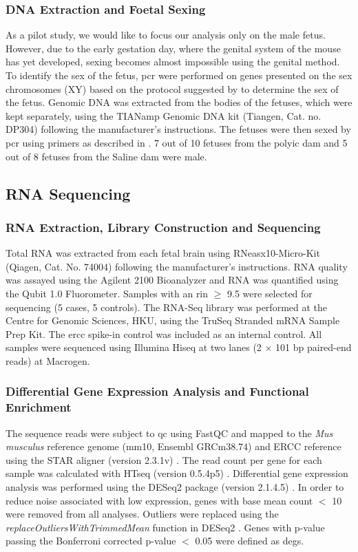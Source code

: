 \subsubsection{DNA Extraction and Foetal Sexing}
As a pilot study, we would like to focus our analysis only on the male fetus.
However, due to the early gestation day, where the genital system of the mouse has yet developed, sexing becomes almost impossible using the genital method.
To identify the sex of the fetus, \gls{pcr} were performed on genes presented on the sex chromosomes (XY) based on the protocol suggested by \citet{Clapcote2005a} to determine the sex of the fetus. 
Genomic DNA was extracted from the bodies of the fetuses, which were kept separately, using the TIANamp Genomic DNA kit (Tiangen, Cat. no. DP304) following the manufacturer's instructions.
The fetuses were then sexed by \gls{pcr} using primers as described in \citet{Clapcote2005a}.
 7 out of 10 fetuses from the \gls{polyic} dam and 5 out of 8 fetuses from the Saline dam were male.


\subsection{RNA Sequencing}
\subsubsection{RNA Extraction, Library Construction and Sequencing}
Total RNA was extracted from each fetal brain using RNeasx10-Micro-Kit (Qiagen, Cat. No. 74004) following the manufacturer’s instructions. 
RNA quality was assayed using the Agilent 2100 Bioanalyzer and RNA was quantified using the Qubit 1.0 Fluorometer. 
Samples with an \gls{rin} $\ge$ 9.5 were selected for sequencing (5 cases, 5 controls). 
The RNA-Seq library was performed at the Centre for Genomic Sciences, HKU, using the TruSeq Stranded mRNA Sample Prep Kit. 
The \gls{ercc} spike-in control \citep{Jiang2011a} was included as an internal control. 
All samples were sequenced using Illumina Hiseq at two lanes (2 $\times$ 101 bp paired-end reads) at Macrogen.

\subsubsection{Differential Gene Expression Analysis and Functional Enrichment}

The sequence reads were subject to \gls{qc} using FastQC \citep{Andrews} and mapped to the \textit{Mus musculus} reference genome (mm10, Ensembl GRCm38.74) and ERCC reference using the STAR aligner (version 2.3.1v) \citep{Dobin2013}.
The read count per gene for each sample was calculated with HTseq (version 0.5.4p5) \citep{Anders2015}.
Differential gene expression analysis was performed using the DESeq2 package (version 2.1.4.5) \citep{Anders2010}.
In order to reduce noise associated with low expression, genes with base mean count $<$ 10 were removed from all analyses.
Outliers were replaced using the \textit{replaceOutliersWithTrimmedMean} function in DESeq2 \citep{Anders2010}. 
Genes with p-value passing the Bonferroni corrected p-value $<$ 0.05 were defined as \glspl{deg}. 

